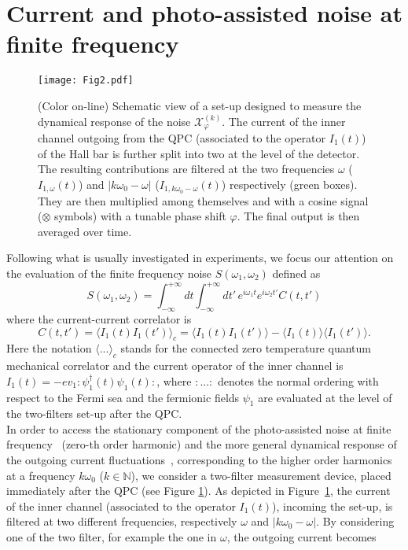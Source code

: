 \documentclass[12pt]{iopart}
\begin{document}

\section{Current and photo-assisted noise at finite frequency}\label{noise}
\begin{figure}[ht]
\centering
\texttt{[image: Fig2.pdf]}
\caption{(Color on-line) Schematic view of a set-up designed to measure the dynamical response of the noise $\mathcal{X}_{\varphi}^{(k)}$. The current of the inner channel outgoing from the QPC (associated to the operator $I_1(t)$) of the Hall bar is further split into two at the level of the detector. The resulting contributions are filtered at the two frequencies $\omega$ ($I_{1,\omega}(t)$) and $|k \omega_{0}-\omega|$ ($I_{1,k\omega_0-\omega}(t)$) respectively (green boxes). They are then multiplied among themselves and with a cosine signal ($\otimes$ symbols) with a tunable phase shift $\varphi$. The final output is then averaged over time.}
\label{Fig2}
\end{figure}  
Following what is usually investigated in experiments, we focus our attention on the evaluation of the finite frequency noise $S(\omega_1,\omega_2)$ defined as~\cite{Blanter00, Martin05, Ferraro14b}
\begin{equation}
    S(\omega_1,\omega_2)=\int_{-\infty}^{+\infty} dt \int_{-\infty}^{+\infty} dt' \,e^{i\omega_1 t} e^{i\omega_2 t'} C(t,t')
\end{equation}
where the current-current correlator is
\begin{equation}
    C(t,t')=\langle I_1(t)I_1(t')\rangle_c=\langle I_1(t)I_1(t')\rangle-\langle I_1(t)\rangle\langle I_1(t')\rangle.
\end{equation}
Here the notation $\langle ... \rangle_c$ stands for the connected zero temperature quantum mechanical correlator and the current operator of the inner channel is $I_1(t)=-ev_1:\psi_1^\dagger(t)\psi_1(t):$, where $:...:$ denotes the normal ordering with respect to the Fermi sea and the fermionic fields $\psi_1$ are evaluated at the level of the two-filters set-up after the QPC.\\ 
In order to access the stationary component of the photo-assisted noise at finite frequency~\cite{Blanter00, Martin05, Lesovik94, Schoelkopf98} (zero-th order harmonic) and the more general dynamical response of the outgoing current fluctuations~\cite{ Ferraro18, Gabelli08, Gabelli08b}, corresponding to the higher order harmonics at a frequency $k\omega_{0}$ ($k \in \mathbb N$), we consider a two-filter measurement device, placed immediately after the QPC (see Figure \ref{Fig2}). As depicted in Figure~\ref{Fig2}, the current of the inner channel (associated to the operator $I_1(t)$), incoming the set-up, is filtered at two different frequencies, respectively $\omega$ and $|k\omega_0-\omega|$. By considering one of the two filter, for example the one in $\omega$, the outgoing current becomes
\end{document}
